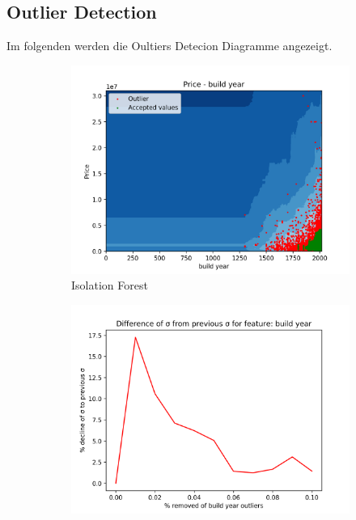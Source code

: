 \subsection{Outlier Detection}
Im folgenden werden die Oultiers Detecion Diagramme angezeigt.
\begin{figure}[H]
\begin{subfigure}{.5\textwidth}
\centering
  \includegraphics[width=\linewidth]{images/anhang/outlier_detection/build_year_IsolationForest.png}
  \caption{Isolation Forest}
\end{subfigure}
\begin{subfigure}{.5\textwidth}
  \centering
  \includegraphics[width=\linewidth]{images/anhang/outlier_detection/build_year_diff_of_std.png}

\end{subfigure}
\end{figure}
